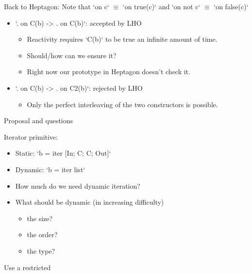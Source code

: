 \documentclass[xcolor=dvipsnames]{beamer}
\begin{document}
\begin{frame}[fragile]{Back to Heptagon:}
Note that `on c` $\equiv$ `on true(c)` and `on not c` $\equiv$ `on false(c)`
\begin{block}{}
\begin{itemize}
  \item `. on C(b) -> . on C(b)`: accepted by LHO
    \begin{itemize}
      \item Reactivity requires `C(b)` to be true an infinite amount of time.
      \item Should/how can we ensure it?
      \item Right now our prototype in Heptagon doesn't check it.
    \end{itemize}
  \item `. on C(b) -> . on C2(b)`: rejected by LHO
    \begin{itemize}
      \item Only the perfect interleaving of the two constructors is possible.
    \end{itemize}
\end{itemize}
\end{block}
\end{frame}

\begin{frame}[fragile]{Proposal and questions}
\begin{block}{Iterator primitive:}
\begin{itemize}
  \item Static: `b = iter [In; C; C; Out]`
  \item Dynamic: `b = iter list`
\end{itemize}
\end{block}
\begin{block}{}
\begin{itemize}
  \item How much do we need dynamic iteration?
  \item What should be dynamic (in increasing difficulty)
    \begin{itemize}
      \item the size?
      \item the order?
      \item the type?
  \end{itemize}
\end{itemize}
\end{block}
\begin{block}
Use a restricted
\end{block}
\end{frame}
\end{document}
